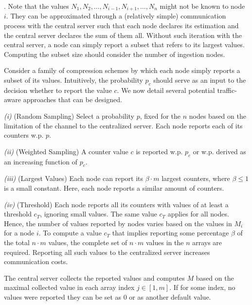 . Note that the values $N_1, N_2, \ldots, N_{i-1}, N_{i+1}, \ldots, N_n$ might not be known to node $i$. They can be approximated through a (relatively simple) communication process with the central server such that each node declares its estimation and the central server declares the sum of them all. Without such iteration with the central server, a node can simply report a subset that refers to its largest values. Computing the subset size should consider the number of ingestion nodes.

Consider a family of compression schemes by which each node simply reports a subset of its values. Intuitively, the probability $p_c$ should serve as an input to the decision whether to report the value $c$. We now detail several  potential traffic-aware approaches that can be designed.

\emph{(i)} (Random Sampling) Select a probability $p$, fixed for the $n$ nodes based on the limitation of the channel to the centralized server. Each node reports each of its counters w.p. $p$.

\emph{(ii)} (Weighted Sampling) A counter value $c$ is reported w.p. $p_c$ or w.p. derived as an increasing function of $p_c$.

\emph{(iii)} (Largest Values) Each node can report its  $\beta \cdot m$ largest counters, where $\beta \le 1$ is a small constant. Here, each node reports a similar amount of counters.


\emph{(iv)} (Threshold) Each node reports all its counters with values of at least a threshold $c_T$, ignoring  small values. The same value $c_T$ applies for all nodes.  Hence, the number of values reported by  nodes varies based on the values in $M_i$ for a node $i$. 
To compute a value $c_T$ that implies reporting some percentage $\beta$ of the total $n \cdot m$ values, the complete set of $n \cdot m$ values in the $n$ arrays are required. Reporting all such values to the centralized server increases communication costs. 

The central server collects the reported values and computes $M$ based on the maximal collected value in each array index  $j \in [1,m]$. If for some index, no values were reported they can be set as 0 or as another default value.
